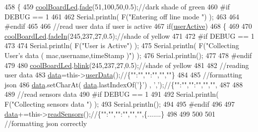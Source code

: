 \begin{DoxyCode}
458 \{
459     \hyperlink{classCoolBoard_a1b1d3c684a5baa56b08486e192fd8e97}{coolBoardLed}.\hyperlink{classCoolBoardLed_af1cacbaa88db8bcf6042c1083ba41155}{fade}(51,100,50,0.5);\textcolor{comment}{//dark shade of green  }
460 \textcolor{preprocessor}{#if DEBUG == 1  }
461     
462     Serial.println( F(\textcolor{stringliteral}{"Entering off line mode "}) ); 
463     
464 \textcolor{preprocessor}{#endif}
465 
466     \textcolor{comment}{//read user data if user is active}
467     \textcolor{keywordflow}{if}(\hyperlink{classCoolBoard_a6395459131d6889a3005f79c7a35e964}{userActive})
468     \{
469 
470         \hyperlink{classCoolBoard_a1b1d3c684a5baa56b08486e192fd8e97}{coolBoardLed}.\hyperlink{classCoolBoardLed_ab778f5e7bed0ab74e3906d82110493c3}{fadeIn}(245,237,27,0.5);\textcolor{comment}{//shade of yellow}
471 
472 \textcolor{preprocessor}{    #if DEBUG == 1}
473         
474         Serial.println( F(\textcolor{stringliteral}{"User is Active"}) );
475         Serial.println( F(\textcolor{stringliteral}{"Collecting User's data ( mac,username,timeStamp )"}) );
476         Serial.println();
477 
478 \textcolor{preprocessor}{    #endif}
479 
480         \hyperlink{classCoolBoard_a1b1d3c684a5baa56b08486e192fd8e97}{coolBoardLed}.\hyperlink{classCoolBoardLed_a96e1ea13003eee34c9dbcef340404426}{blink}(245,237,27,0.5);\textcolor{comment}{//shade of yellow   }
481 
482         \textcolor{comment}{//reading user data}
483         \hyperlink{classCoolBoard_a427fb753dd8575bdf821c70a5c63d695}{data}=this->\hyperlink{classCoolBoard_ae7358fb6e623cfc81b775f5f1734909b}{userData}();\textcolor{comment}{//\{"":"","":"","",""\}}
484 
485         \textcolor{comment}{//formatting json }
486         \hyperlink{classCoolBoard_a427fb753dd8575bdf821c70a5c63d695}{data}.setCharAt( \hyperlink{classCoolBoard_a427fb753dd8575bdf821c70a5c63d695}{data}.lastIndexOf(\textcolor{charliteral}{'\}'}) , \textcolor{charliteral}{','});\textcolor{comment}{//\{"":"","":"","","",}
487         
488                 
489         \textcolor{comment}{//read sensors data}
490 \textcolor{preprocessor}{    #if DEBUG == 1}
491 
492         Serial.println( F(\textcolor{stringliteral}{"Collecting sensors data "}) );
493         Serial.println();
494 
495 \textcolor{preprocessor}{    #endif}
496 
497         \hyperlink{classCoolBoard_a427fb753dd8575bdf821c70a5c63d695}{data}+=this->\hyperlink{classCoolBoard_ad03abdce2e65f520bbf2cff0f2d083cf}{readSensors}();\textcolor{comment}{//\{"":"","":"","","",\{.......\}}
498 
499         
500 
501         \textcolor{comment}{//formatting json correctly}

\end{DoxyCode}
